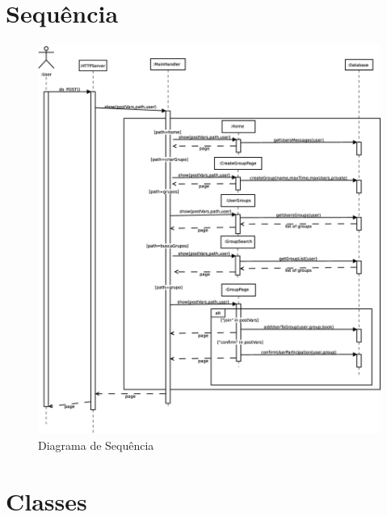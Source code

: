 \documentclass[a4paper]{article}
\begin{document}
\section{Sequência}
 \begin{figure}[H]
  \includegraphics[width=\textwidth]{sequencia.eps}
  \caption{Diagrama de Sequência}
 \end{figure}
 
 \section{Classes}
 
\end{document}
